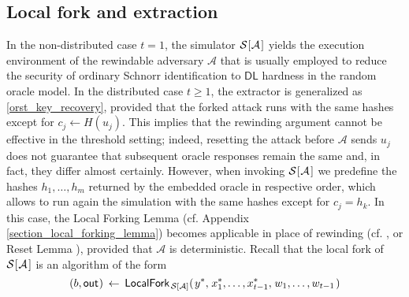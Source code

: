 \documentclass{iacrtrans}
\begin{document}
\subsection{Local fork and extraction}\label{section_extractability}

In the non-distributed case $t=1$,
the simulator
$\mathcal{S}\hspace{0.5pt}[\hspace{0.5pt}\mathcal{A}\hspace{1pt}]$
yields the execution environment of the rewindable adversary
$\mathcal{A}$ that is usually employed to
reduce the security of ordinary Schnorr identification
to $\mathsf{DL}$ hardness in the random oracle model.
In the distributed case $t \ge 1$, the extractor is generalized as
\eqref{orst_key_recovery},
provided that the forked attack runs with the same hashes
except for $c_j \leftarrow H(u_j)$.
This implies that the rewinding argument
cannot be effective in the threshold setting;
indeed, resetting the attack before
$\mathcal{A}$ sends $u_j$ does not
guarantee that subsequent oracle responses remain the same
and, in fact, they differ almost certainly.
However, when invoking
$\mathcal{S}\hspace{0.5pt}[\hspace{0.5pt}\mathcal{A}\hspace{1pt}]$
we predefine the hashes $h_1, \dots, h_m$
returned by the embedded oracle in respective order,
which allows to run again the simulation with the same hashes
except for $c_j = h_k$.
In this case, the Local Forking Lemma
(cf. Appendix \ref{section_local_forking_lemma})
becomes applicable in place of rewinding
(cf. \cite{paper_bellare_musig}, or Reset Lemma \cite{paper_bellare_palacio}),
provided that $\mathcal{A}$
is deterministic.
Recall that the local fork of
$\mathcal{S}\hspace{0.5pt}[\hspace{0.5pt}\mathcal{A}\hspace{1pt}]$
is an algorithm of the form
\vspace{5pt}
\begin{equation*}
(
	\vspace{1pt}
	b,
	\vspace{1pt}
	\mathsf{out}
	\hspace{0.5pt}
)
\hspace{2pt}
\leftarrow
\hspace{2pt}
\mathsf{LocalFork}_{
		\hspace{1pt}
    	\mathcal{S}\hspace{0pt}[
    		\hspace{0pt}
    		\mathcal{A}
    		\hspace{0pt}
    	]
    }
	(
   		\hspace{1pt}
		y ^*,
		\hspace{1pt}
		x_1^*, \dots, x_{t-1}^*,
		\hspace{1pt}
		w_1, \dots, w_{t-1}
		\hspace{1pt}
   	)
\vspace{5pt}
\end{equation*}
\end{document}
